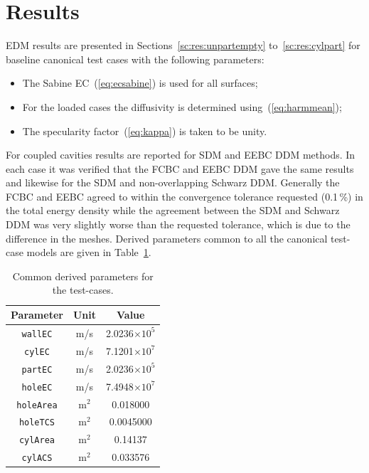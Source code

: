\documentclass[a4paper]{article}
\numberwithin{equation}{section}
\newcounter{Table}
\begin{document}
\section[Results]{Results}
\label{sc:res}

EDM results are presented in Sections~\ref{sc:res:unpartempty} to~\ref{sc:res:cylpart} for baseline canonical 
test cases with the following parameters:
\begin{itemize}
 \item The Sabine EC~(\ref{eq:ecsabine}) is used for all surfaces;
 \item For the loaded cases the diffusivity is determined using~(\ref{eq:harmmean});
 \item The specularity factor~(\ref{eq:kappa}) is taken to be unity.
\end{itemize}
For coupled cavities results are reported for SDM and EEBC DDM methods. In each case it was verified
that the FCBC and EEBC DDM gave the same results and likewise for the SDM and non-overlapping Schwarz
DDM. Generally the FCBC and EEBC agreed to within the convergence tolerance requested (0.1\,\%) in the 
total energy density while the agreement between the SDM and Schwarz DDM was very slightly worse than
the requested tolerance, which is due to the difference in the meshes. Derived parameters common 
to all the canonical test-case models are given in Table~\ref{tb:derivparams}.

\begin{table}[ht]
\begin{center}
\begin{tabular}{|c|c|c|}
\hline
\textbf{Parameter}     &\textbf{Unit} &\textbf{Value}\\ 
\hline
\texttt{wallEC}        &m/s           &2.0236$\times 10^5$ \\
\texttt{cylEC}         &m/s           &7.1201$\times 10^7$ \\
\texttt{partEC}        &m/s           &2.0236$\times 10^5$ \\
\texttt{holeEC}        &m/s           &7.4948$\times 10^7$ \\
\texttt{holeArea}      &m$^2$         &0.018000            \\
\texttt{holeTCS}       &m$^2$         &0.0045000           \\
\texttt{cylArea}       &m$^2$         &0.14137             \\
\texttt{cylACS}        &m$^2$         &0.033576            \\
\hline
\end{tabular}
\end{center}
\caption{\label{tb:derivparams} Common derived parameters for the test-cases.}
\end{table}
\end{document}
